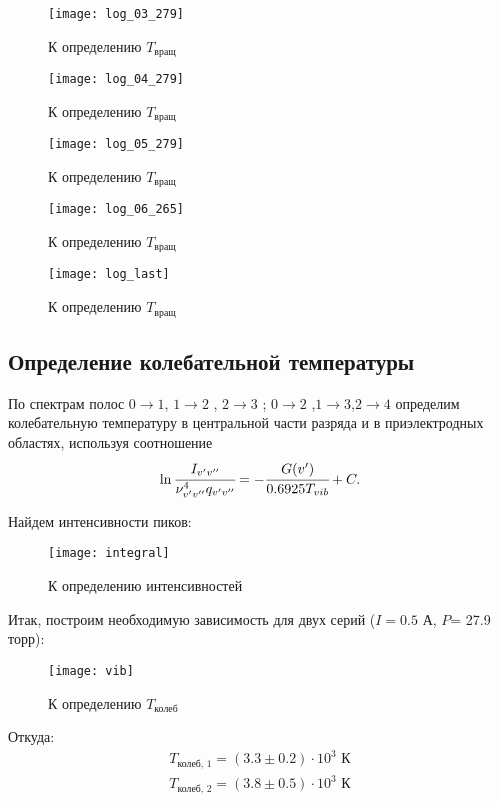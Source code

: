 \begin{figure}[H]
\begin{minipage}{0.45\linewidth}
	\centering
	\texttt{[image: log\_03\_279]}
	\caption{К определению $T_{\text{вращ}}$}
	\label{log_03_279}
\end{minipage} 
\hfill
\begin{minipage}[H]{0.45\linewidth}
	\centering
	\texttt{[image: log\_04\_279]}
	\caption{К определению $T_{\text{вращ}}$}
	\label{log_04_279}
\end{minipage}
\end{figure}
\begin{figure}[H]
\begin{minipage}{0.45\linewidth}
	\centering
	\texttt{[image: log\_05\_279]}
	\caption{К определению $T_{\text{вращ}}$}
	\label{log_05_279}
\end{minipage} 
\hfill
\begin{minipage}[H]{0.45\linewidth}
	\centering
	\texttt{[image: log\_06\_265]}
	\caption{К определению $T_{\text{вращ}}$}
	\label{log_06_265}
\end{minipage}
\end{figure}
\begin{figure}[H]
	\centering
	\texttt{[image: log\_last]}
	\caption{К определению $T_{\text{вращ}}$}
	\label{log_add}
\end{figure}
\subsection{Определение колебательной температуры}
По спектрам полос $0\to1$, $1\to2$ , $2 \to3$ ; $0 \to 2$ ,$1\to 3$,$2 \to 4$ определим
колебательную температуру в центральной части разряда и в приэлектродных
областях, используя соотношение
\begin{equation}
\ln\cfrac{I_{v'v''}}{\nu^4_{v'v''}q_{v'v''}} = -\cfrac{G(v')}{0.6925 T_{vib}} +C.
\end{equation}

Найдем интенсивности пиков:
\begin{figure}[H]
	\centering
	\texttt{[image: integral]}
	\caption{К определению интенсивностей}
	\label{integral}
\end{figure}


Итак, построим необходимую зависимость для двух серий ($I= 0.5 $ А, $P$= 27.9 торр):
\begin{figure}[H]
	\centering
	\texttt{[image: vib]}
	\caption{К определению $T_{\text{колеб}}$}
	\label{vib}
\end{figure}
Откуда:
\begin{eqnarray}
T_{\text{колеб, 1}} = (3.3\pm0.2)\cdot10^3 \text{ К}\\
T_{\text{колеб, 2}} = (3.8\pm0.5)\cdot10^3 \text{ К}
\end{eqnarray}
